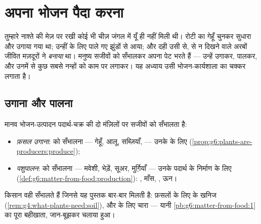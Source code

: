 \chapter{अपना भोजन पैदा करना}\label{ch:g6:producing-our-food}

तुम्हारे नाश्ते की मेज़ पर रखी कोई भी चीज़ जंगल में यूँ ही नहीं मिली थी।
रोटी का गेहूँ चुनकर सुधारा और उगाया गया था;  उन्हीं के लिए पाले गए
झुंडों से आया; और दही उसी  से,  से न दिखने वाले अरबों जीवित
मज़दूरों ने \emph{बनाया} था। मनुष्य सजीवों को सँभालकर अपना पेट भरते हैं
--- उन्हें उगाकर, पालकर, और उनमें से कुछ सबसे नन्हों को काम पर लगाकर।
यह अध्याय उसी भोजन-कार्यशाला का चक्कर लगाता है।

\section{उगाना और पालना}

\begin{definition}[फ़सल और पशुधन]\label{def:g6:producing-our-food:farming}
मानव भोजन-उत्पादन पदार्थ-चक्र की दो मंज़िलों पर सजीवों को सँभालता है:
\begin{itemize}
  \item \emph{फ़सल उगाना}:  को सँभालना --- गेहूँ,
        आलू, सब्ज़ियाँ,  --- उनके  के लिए
        (\cref{prop:g6:plants-are-producers:produce});
  \item \emph{पशुपालन}:  को सँभालना ---
        मवेशी, भेड़ें, सूअर, मुर्ग़ियाँ --- उनके
        पदार्थ के निर्माण के लिए
        (\cref{def:g6:matter-from-food:production}): , माँस, ,
        ऊन।
\end{itemize}
किसान वही  सँभालते हैं जिनसे यह पुस्तक बार-बार मिलती है:
फ़सलों के लिए  के खनिज (\cref{rem:g4:what-plants-need:soil}), और
 के लिए चारा --- यानी \cref{pb:g6:matter-from-food:1} का पूरा
बहीखाता, जान-बूझकर चलाया हुआ।
\end{definition}

